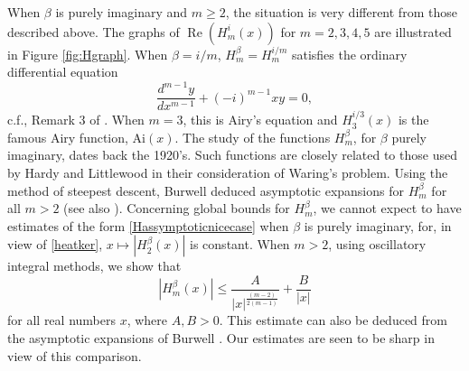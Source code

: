 \documentclass{article}
\theoremstyle{theorem}
\theoremstyle{remark}
\renewcommand\Re{\operatorname{Re}}%
\begin{document}
\noindent When $\beta$ is purely imaginary and $m\geq 2$, the situation is very different from those described above. The graphs of $\Re(H_m^i(x))$ for $m=2,3,4,5$ are illustrated in Figure \ref{fig:Hgraph}. When $\beta=i/m$, $H_m^{\beta}=H_m^{i/m}$ satisfies the ordinary differential equation
\begin{equation*}
\frac{d^{m-1}y}{dx^{m-1}}+(-i)^{m-1}xy=0,
\end{equation*}
c.f., Remark $3$ of \cite{RH}. When $m=3$, this is Airy's equation and $H_3^{i/3}(x)$ is the famous Airy function, $\text{Ai}(x)$. The study of the functions $H_m^{\beta}$, for $\beta$ purely imaginary, dates back the 1920's. Such functions are closely related to those used by Hardy and Littlewood \cite{HardyLittlewood1920} in their consideration of Waring's problem. Using the method of steepest descent, Burwell \cite{Burwell1924} deduced asymptotic expansions for $H_m^{\beta}$ for all $m>2$ (see also \cite{Bakhoom1933}). Concerning global bounds for $H_m^{\beta}$, we cannot expect to have estimates of the form \eqref{Hassymptoticnicecase} when $\beta$ is purely imaginary, for, in view of \eqref{heatker}, $x\mapsto |H_2^{\beta}(x)|$ is constant. When $m>2$, using oscillatory integral methods, we show that 
\begin{equation*}
|H_m^{\beta}(x)|\leq \frac{A}{|x|^{\frac{(m-2)}{2(m-1)}}}+\frac{B}{|x|}
\end{equation*}
for all real numbers $x$, where $A,B>0$. This estimate can also be deduced from the asymptotic expansions of Burwell \cite{Burwell1924}. Our estimates are seen to be sharp in view of this comparison.\\
\end{document}
